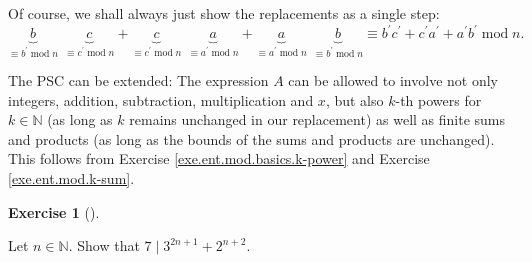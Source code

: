 \documentclass[numbers=enddot,12pt,final,onecolumn,notitlepage]{scrartcl}%
\newcounter{exer}
\numberwithin{exer}{subsection}
\theoremstyle{definition}
\newtheorem{exmp}[exer]{Exercise}
\newenvironment{exercise}[1][]
{\begin{exmp}[#1]\begin{leftbar}}
{\end{leftbar}\end{exmp}}
\begin{document}
Of course, we shall always just show the replacements as a single step:%
\[
\underbrace{b}_{\equiv b^{\prime}\operatorname{mod}n}\ \ \underbrace{c}%
_{\equiv c^{\prime}\operatorname{mod}n}+\underbrace{c}_{\equiv c^{\prime
}\operatorname{mod}n}\ \ \underbrace{a}_{\equiv a^{\prime}\operatorname{mod}%
n}+\underbrace{a}_{\equiv a^{\prime}\operatorname{mod}n}\ \ \underbrace{b}%
_{\equiv b^{\prime}\operatorname{mod}n}\equiv b^{\prime}c^{\prime}+c^{\prime
}a^{\prime}+a^{\prime}b^{\prime}\operatorname{mod}n.
\]


The PSC can be extended: The expression $A$ can be allowed to involve not only
integers, addition, subtraction, multiplication and $x$, but also $k$-th
powers for $k\in\mathbb{N}$ (as long as $k$ remains unchanged in our
replacement) as well as finite sums and products (as long as the bounds of the
sums and products are unchanged). This follows from Exercise
\ref{exe.ent.mod.basics.k-power} and Exercise \ref{exe.ent.mod.k-sum}.

\begin{exercise}
\label{exe.ent.mod.substitutivity.7div}Let $n\in\mathbb{N}$. Show that
$7\mid3^{2n+1}+2^{n+2}$.
\end{exercise}
\end{document}
